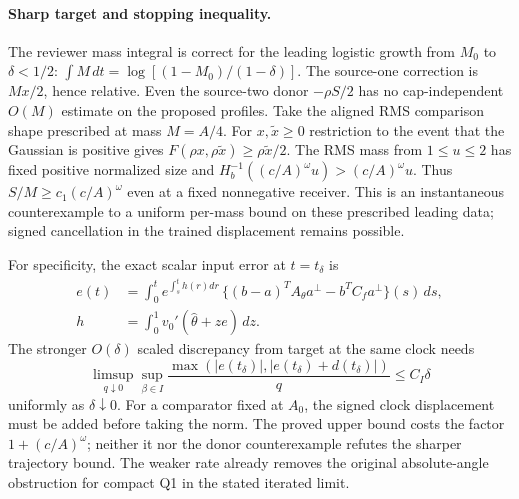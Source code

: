 \documentclass[11pt]{article}
\begin{document}
\paragraph{Sharp target and stopping inequality.}\label{an04ctev1:sharp}
The reviewer mass integral is correct for the leading logistic growth
from $M_0$ to $\delta<1/2$:
$\int M\,dt=\log[(1-M_0)/(1-\delta)]$. The source-one correction
is $Mx/2$, hence relative. Even the source-two donor $-\rho S/2$
has no cap-independent $O(M)$ estimate on the proposed profiles.
Take the aligned RMS comparison shape prescribed at mass $M=A/4$.
For $x,\tilde x\ge0$ restriction to the event that the Gaussian is
positive gives $F(\rho x,\rho\tilde x)\ge\rho\tilde x/2$.
The RMS mass from $1\le u\le2$ has fixed positive normalized size
and $H_b^{-1}((c/A)^\omega u)>(c/A)^\omega u$. Thus
$S/M\ge c_1(c/A)^\omega$ even at a fixed nonnegative receiver.
This is an instantaneous counterexample to a uniform per-mass bound
on these prescribed leading data; signed cancellation in the trained
displacement remains possible.

For specificity, the exact scalar input error at $t=t_\delta$ is
\begin{align*}
 e(t)&=\int_0^t e^{\int_s^t h(r)dr}\,
 \{(b-a)^T A_\theta a^\perp-b^TC_f a^\perp\}(s)\,ds,\\
 h&=\int_0^1 v_0'(\widehat\theta+z e)\,dz .
\end{align*}
The stronger $O(\delta)$ scaled discrepancy from target at the
same clock needs
\begin{equation}\label{an04ctev1:missing}
 \limsup_{q\downarrow0}\sup_{\beta\in I}
  \frac{\max(|e(t_\delta)|,|e(t_\delta)+d(t_\delta)|)}q
  \le C_I\delta
\end{equation}
uniformly as $\delta\downarrow0$. For a comparator fixed at $A_0$,
the signed clock displacement must be added before taking the norm.
The proved upper bound costs the factor $1+(c/A)^\omega$;
neither it nor the donor counterexample refutes the sharper trajectory
bound. The weaker rate already removes the original absolute-angle
obstruction for compact Q1 in the stated iterated limit.
\end{document}
